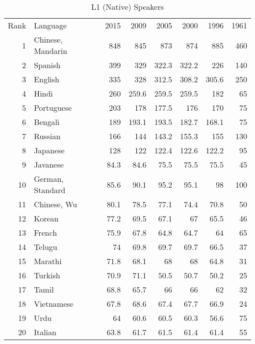 \begin{appendices}
\begin{table}[H]
	\centering
	\caption{L1 (Native) Speakers}
	\begin{tabular}{rlrrrrrr}
		\multicolumn{1}{l}{Rank} & Language & 2015  & 2009  & 2005  & 2000  & 1996  & 1961 \\
		1     & Chinese, Mandarin  & 848   & 845   & 873   & 874   & 885   & 460 \\
		2     & Spanish  & 399   & 329   & 322.3 & 322.2 & 226   & 140 \\
		3     & English  & 335   & 328   & 312.5 & 308.2 & 305.6 & 250 \\
		4     & Hindi  & 260   & 259.6 & 259.5 & 259.5 & 182   & 65 \\
		5     & Portuguese  & 203   & 178   & 177.5 & 176   & 170   & 75 \\
		6     & Bengali  & 189   & 193.1 & 193.5 & 182.7 & 168.1 & 75 \\
		7     & Russian  & 166   & 144   & 143.2 & 155.3 & 155   & 130 \\
		8     & Japanese  & 128   & 122   & 122.4 & 122.6 & 122.2 & 95 \\
		9     & Javanese  & 84.3  & 84.6  & 75.5  & 75.5  & 75.5  & 45 \\
		10    & German, Standard  & 85.6  & 90.1  & 95.2  & 95.1  & 98    & 100 \\
		11    & Chinese, Wu  & 80.1  & 78.5  & 77.1  & 74.4  & 70.8  & 50 \\
		12    & Korean  & 77.2  & 69.5  & 67.1  & 67    & 65.5  & 46 \\
		13    & French  & 75.9  & 67.8  & 64.8  & 64.7  & 64    & 65 \\
		14    & Telugu  & 74    & 69.8  & 69.7  & 69.7  & 66.5  & 37 \\
		15    & Marathi  & 71.8  & 68.1  & 68    & 68    & 64.8  & 31 \\
		16    & Turkish  & 70.9  & 71.1  & 50.5  & 50.7  & 50.2  & 25 \\
		17    & Tamil  & 68.8  & 65.7  & 66    & 66    & 62    & 32 \\
		18    & Vietnamese  & 67.8  & 68.6  & 67.4  & 67.7  & 66.9  & 24 \\
		19    & Urdu  & 64    & 60.6  & 60.5  & 60.3  & 56.6  & 75 \\
		20    & Italian  & 63.8  & 61.7  & 61.5  & 61.4  & 61.4  & 55 \\
	\end{tabular}%
	\label{tab:addlabel}%
\end{table}%

	
\end{appendices}
